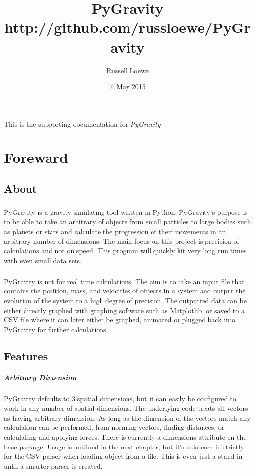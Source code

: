 \documentclass[15pt]{report}
\title{PyGravity \\
		\small http://github.com/russloewe/PyGravity}
\author{Russell Loewe}
\date{7~May 2015}
\begin{document}
\maketitle

\indent
This is the supporting documentation for
\textit{PyGravity} 

\tableofcontents

\newpage
\chapter{Foreward}

\section{About}

\paragraph{}PyGravity is a gravity simulating tool written in Python. PyGravity's purpose is to be able to take an arbitrary 
of objects  from small particles to large bodies such as planets or stars and calculate the progression of their movements 
in an arbitrary number of dimensions. The main focus on this project is precision of calculations and not on speed. This program 
will quickly hit very long run times with even small data sets. 
\paragraph{}PyGravity is not for real time calculations. The aim is to take an input file that contains the position, mass, and 
velocities of objects in a system and output the evolution of the system to a high degree of precision. The outputted data can be 
either directly graphed with graphing software such as Matplotlib, or saved to a CSV file where it can later either be graphed, 
animated or plugged back into PyGravity for further calculations.

\section{Features}
\paragraph{Arbitrary Dimension} PyGravity defaults to 3 spatial dimensions, but it can easily be configured to work in any 
number of spatial dimensions. The underlying code treats all vectors as having arbitrary dimension. As long as the dimension 
of the vectors match any calculation can be performed, from norming vectors, finding distances, or calculating and applying forces. 
There is currently a dimensions attribute on the base package. Usage is outlined in the next chapter, but it's existence is 
strictly for the CSV parser when loading object from a file. This is even just a stand in until a smarter parser is created.
\end{document}
